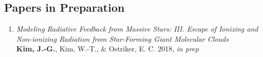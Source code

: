 \subsection{Papers in Preparation}
\begin{enumerate}
\item[] \textit{Modeling Radiative Feedback from Massive Stars: III.
    Escape of Ionizing and Non-ionizing Radiation from Star-Forming
    Giant Molecular Clouds} \\
  \textbf{Kim, J.-G.}, Kim, W.-T., \& Ostriker, E. C. 2018, \textit{in
    prep}
\end{enumerate}


